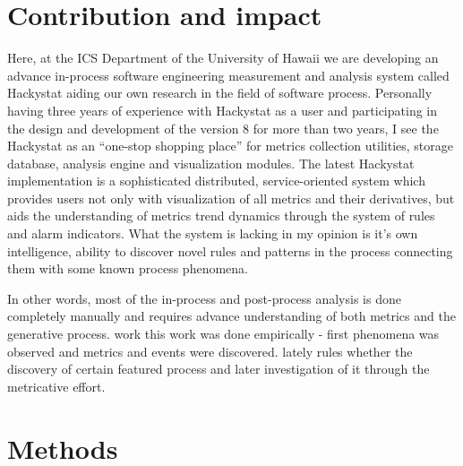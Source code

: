\documentclass[11pt,oneside]{article}
\begin{document}
\section{Contribution and impact}
Here, at the ICS Department of the University of Hawaii we are developing an advance in-process software engineering measurement and analysis system called Hackystat aiding our own research in the field of software process. Personally having three years of experience with Hackystat as a user and participating in the design and development of the version 8 for more than two years, I see the Hackystat as an ``one-stop shopping place'' for metrics collection utilities, storage database, analysis engine and visualization modules. The latest Hackystat implementation is a sophisticated distributed, service-oriented system which provides users not only with visualization of all metrics and their derivatives, but aids the understanding of metrics trend dynamics through the system of rules and alarm indicators. What the system is lacking in my opinion is it's own intelligence, ability to discover novel rules and patterns in the process connecting them with some known process phenomena. 

In other words, most of the in-process and post-process analysis is done completely manually and requires advance understanding of both metrics and the generative process. work this work was done empirically - first phenomena was observed and metrics and events were discovered. lately rules whether the  discovery of certain featured process and later investigation of it through the metricative effort.


\section{Methods}
\end{document}
